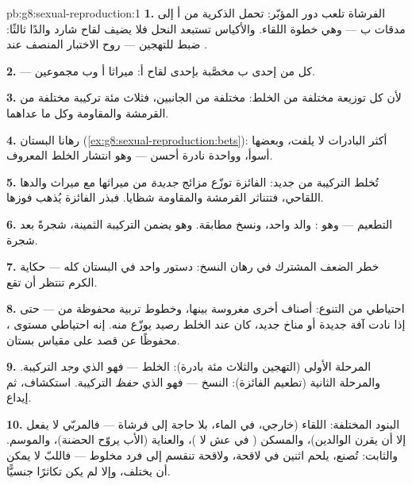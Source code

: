 \begin{solution}{pb:g8:sexual-reproduction:1}
\textbf{1.} الفرشاة تلعب دور المؤبّر: تحمل  الذكرية من أ
إلى مدقات ب --- وهي خطوة اللقاء. والأكياس تستبعد النحل فلا يضيف
لقاح شارد والدًا ثالثًا: ضبط للتهجين --- روح الاختبار المنصف عند
.

\textbf{2.}  --- كل   من إحدى  ب مخصَّبة بإحدى
 لقاح أ: ميراثا أ وب مجموعين.

\textbf{3.} لأن كل  توزيعة مختلفة من الخلط:  مختلفة من
الجانبين، فثلاث مئة تركيبة مختلفة من القرمشة والمقاومة وكل ما
عداهما.

\textbf{4.} رهانا البستان
(\cref{ex:g8:sexual-reproduction:bets}): أكثر البادرات لا يلفت،
وبعضها أسوأ، وواحدة نادرة أحسن --- وهو انتشار الخلط المعروف.

\textbf{5.} تُخلط التركيبة من جديد:  الفائزة توزّع مزائج
\emph{جديدة} من ميراثها مع ميراث والدها اللقاحي، فتتناثر
القرمشة والمقاومة شظايا. فبذر الفائزة يُذهب فوزها.

\textbf{6.} التطعيم --- وهو : والد واحد، ونسخ مطابقة.
وهو يضمن التركيبة الثمينة، شجرةً بعد شجرة.

\textbf{7.} خطر الضعف المشترك في رهان النسخ: دستور واحد في
البستان كله --- حكاية الكرم تنتظر أن تقع.

\textbf{8.} احتياطي من التنوع: أصناف أخرى مغروسة بينها، وخطوط
تربية محفوظة من  --- حتى إذا نادت آفة جديدة أو مناخ جديد،
كان عند الخلط رصيد يوزّع منه. إنه احتياطي مستوى ، محفوظًا عن
قصد على مقياس بستان.

\textbf{9.} المرحلة الأولى (التهجين والثلاث مئة بادرة): الخلط ---
فهو الذي \emph{وجد} التركيبة. والمرحلة الثانية (تطعيم الفائزة):
النسخ --- فهو الذي \emph{حفظ} التركيبة. استكشاف، ثم إيداع.

\textbf{10.} البنود المختلفة: اللقاء (خارجي، في الماء، بلا حاجة
إلى فرشاة --- فالمربّي لا يفعل إلا أن يقرن الوالدين)، والمسكن (
في عش لا )، والعناية (الأب يروّح الحضنة)، والموسم. والثابت:
 تُصنع،  يلحم اثنين في لاقحة، ولاقحة تنقسم إلى فرد
مخلوط --- فاللبّ لا يمكن أن يختلف، وإلا لم يكن تكاثرًا جنسيًّا.


\end{solution}
